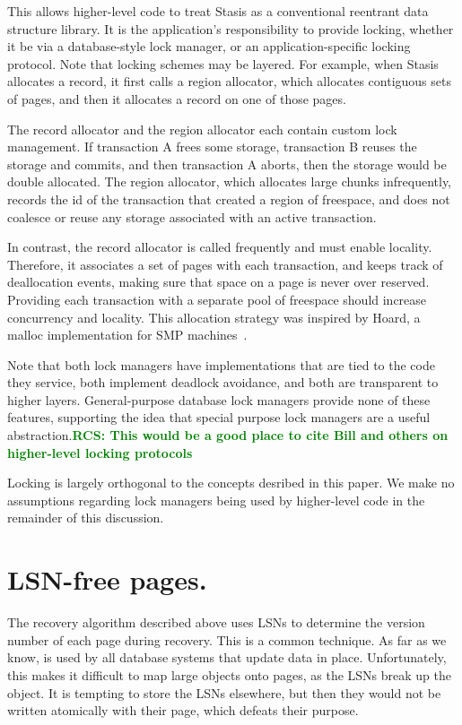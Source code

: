 \documentclass[letterpaper,twocolumn,10pt]{article}
\newcommand{\yad}{Stasis\xspace}
\newcommand{\rcs}[1]{\textcolor{green}{\bf RCS: #1}}
\begin{document}
This allows higher-level code to treat \yad as a conventional
reentrant data structure library.  It is the application's
responsibility to provide locking, whether it be via a database-style
lock manager, or an application-specific locking protocol.  Note that
locking schemes may be layered.  For example, when \yad allocates a
record, it first calls a region allocator, which allocates contiguous
sets of pages, and then it allocates a record on one of those pages.

The record allocator and the region allocator each contain custom lock
management.  If transaction A frees some storage, transaction B reuses
the storage and commits, and then transaction A aborts, then the
storage would be double allocated.  The region allocator, which allocates large chunks infrequently, records the id
of the transaction that created a region of freespace, and does not
coalesce or reuse any storage associated with an active transaction.

In contrast, the record allocator is called frequently and must enable locality.  Therefore, it associates a set of pages with
each transaction, and keeps track of deallocation events, making sure
that space on a page is never over reserved.  Providing each
transaction with a separate pool of freespace should increase
concurrency and locality.  This allocation strategy was inspired by
Hoard, a malloc implementation for SMP machines~\cite{hoard}.

Note that both lock managers have implementations that are tied to the
code they service, both implement deadlock avoidance, and both are
transparent to higher layers.  General-purpose database lock managers
provide none of these features, supporting the idea that special
purpose lock managers are a useful abstraction.\rcs{This would be a
good place to cite Bill and others on higher-level locking protocols}

Locking is largely orthogonal to the concepts desribed in this paper.
We make no assumptions regarding lock managers being used by higher-level code in the remainder of this discussion.

\section{LSN-free pages.}
\label{sec:lsn-free}
The recovery algorithm described above uses LSNs to determine the
version number of each page during recovery.  This is a common
technique.  As far as we know, is used by all database systems that
update data in place.  Unfortunately, this makes it difficult to map
large objects onto pages, as the LSNs break up the object.  It
is tempting to store the LSNs elsewhere, but then they would not be
written atomically with their page, which defeats their purpose.
\end{document}
